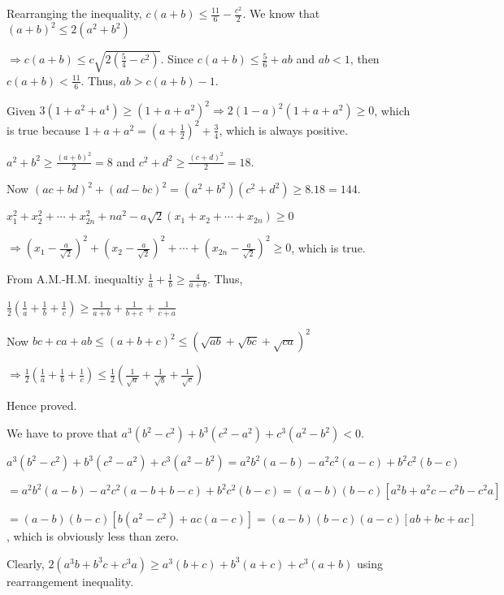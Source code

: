   Rearranging the inequality, $c(a + b)\leq \frac{11}{6} - \frac{c^2}{2}$. We know that $(a + b)^2\leq 2(a^2
  + b^2)$

  $\Rightarrow c(a + b)\leq c\sqrt{2\left(\frac{5}{4} - c^2\right)}$. Since $c(a + b)\leq \frac{5}{6} + ab$
  and $ab < 1$, then $c(a + b) < \frac{11}{6}$. Thus, $ab > c(a + b) - 1$.
\item Given $3(1 + a^2 + a^4)\geq (1 + a + a^2)^2\Rightarrow 2(1- a)^2(1 + a + a^2)\geq 0$, which is true
  because $1 + a + a^2 = \left(a + \frac{1}{2}\right)^2 + \frac{3}{4}$, which is always positive.
\item $a^2 + b^2\geq \frac{(a + b)^2}{2} = 8$ and $c^2 + d^2\geq \frac{(c + d)^2}{2} = 18$.

  Now $(ac + bd)^2 + (ad - bc)^2 = (a^2 + b^2)(c^2 + d^2)\geq 8.18 = 144$.
\item $x_1^2 + x_2^2 + \cdots + x_{2n}^2 + na^2 - a\sqrt{2}(x_1 + x_2 + \cdots + x_{2n})\geq 0$

  $\Rightarrow \left(x_1 - \frac{a}{\sqrt{2}}\right)^2 + \left(x_2 - \frac{a}{\sqrt{2}}\right)^2 + \cdots +
  \left(x_{2n} - \frac{a}{\sqrt{2}}\right)^2\geq 0$, which is true.
\item From A.M.-H.M. inequaltiy $\frac{1}{a} + \frac{1}{b}\geq \frac{4}{a + b}$. Thus,

  $\frac{1}{2}\left(\frac{1}{a} + \frac{1}{b}+ \frac{1}{c}\right)\geq \frac{1}{a + b} + \frac{1}{b + c} +
  \frac{1}{c + a}$

  Now $bc + ca + ab\leq (a + b + c)^2 \leq (\sqrt{ab} + \sqrt{bc} + \sqrt{ca})^2$

  $\Rightarrow \frac{1}{2}\left(\frac{1}{a} + \frac{1}{b} + \frac{1}{c}\right)\leq
  \frac{1}{2}\left(\frac{1}{\sqrt{a}} + \frac{1}{\sqrt{b}} + \frac{1}{\sqrt{c}}\right)$

  Hence proved.
\item We have to prove that $a^3(b^2 - c^2) + b^3(c^2 - a^2) + c^3(a^2 - b^2) < 0$.

  $a^3(b^2 - c^2) + b^3(c^2 - a^2) + c^3(a^2 - b^2) = a^2b^2(a -b) - a^2c^2(a - c) + b^2c^2(b - c)$

  $= a^2b^2(a -b) - a^2c^2(a - b + b - c) + b^2c^2(b - c) = (a - b)(b - c)[a^2b + a^2c - c^2b - c^2a]$

  $= (a - b)(b - c)[b(a^2 - c^2) + ac(a - c)] = (a - b)(b - c)(a - c)[ab + bc + ac]$, which is obviously
  less than zero.
\item Clearly, $2(a^3b + b^3c + c^3a)\geq a^3(b + c) + b^3(a + c) + c^3(a + b)$ using rearrangement
  inequality.

